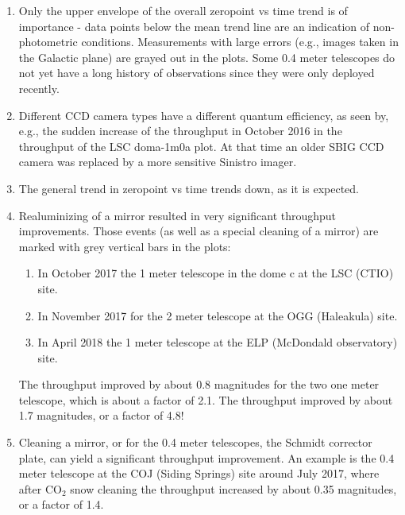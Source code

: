 \documentclass[]{spieman}
\begin{document}
\begin{enumerate}

\item Only the upper envelope of the overall zeropoint vs time trend is of importance - data points
below the mean trend line are an indication of non-photometric conditions. Measurements with large
errors (e.g., images taken in the Galactic plane) are grayed out in the plots. Some 0.4 meter 
telescopes do not yet have a long history of observations since they were only deployed recently.

\item Different CCD camera types have a different quantum efficiency, as seen by, e.g., the sudden
increase of the throughput in October 2016 in the throughput of the LSC doma-1m0a plot. At that time an
older SBIG CCD camera was replaced by a more sensitive Sinistro imager.

\item The general trend in zeropoint vs time trends down, as it is expected.

\item Realuminizing of a mirror resulted in very significant throughput improvements. Those events 
(as well as a special cleaning of a mirror) are marked with grey vertical bars in the plots:
 \begin{enumerate}
 	\item In October 2017 the 1 meter telescope in the dome c at the LSC (CTIO) site.
    \item In November 2017 for the 2 meter telescope at the OGG (Haleakula) site. 
    \item In April 2018 the 1 meter telescope at the ELP  (McDondald observatory) site.
\end{enumerate}
 The throughput improved by about 0.8 magnitudes for the two one meter telescope, which is about a 
 factor of 2.1. The throughput improved by about 1.7 magnitudes, or a factor of 4.8!

\item Cleaning a mirror, or for the 0.4 meter telescopes, the Schmidt corrector plate, can yield
a significant throughput improvement. An example is the 0.4 meter telescope at the COJ (Siding 
Springs) site around July 2017, where after CO$_2$ snow cleaning the throughput increased by about 
0.35 magnitudes, or a factor of 1.4. 


\end{enumerate}
\end{document}
